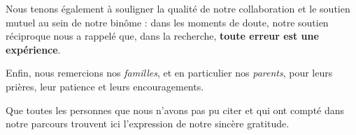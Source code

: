 {Nous tenons également à souligner la qualité de notre collaboration et le soutien mutuel au sein de notre binôme : dans les moments de doute, notre soutien réciproque nous a rappelé que, dans la recherche, \textbf{toute erreur est une expérience}.

Enfin, nous remercions nos \textit{familles}, et en particulier nos \textit{parents}, pour leurs prières, leur patience et leurs encouragements.

Que toutes les personnes que nous n'avons pas pu citer et qui ont compté dans notre parcours trouvent ici l'expression de notre sincère gratitude.

}
